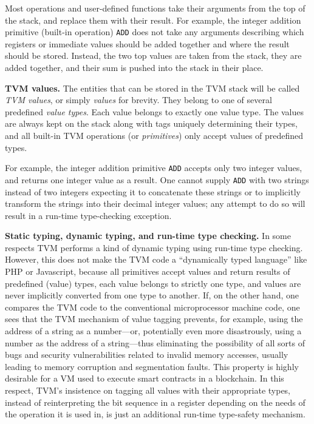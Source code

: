 \documentclass[12pt,oneside]{article}
\def\makepoint#1{\medbreak\noindent{\bf #1.\ }}
\def\nxsubpoint{\refstepcounter{subsubsection}%
  \smallbreak\makepoint{\thesubsubsection}}
\def\emb#1{\textbf{#1.}}
\begin{document}
Most operations and user-defined functions take their arguments from
the top of the stack, and replace them with their result. For example, the integer addition primitive (built-in operation) \texttt{ADD} does not take any arguments describing which registers or immediate values should be added together and where the result should be stored. Instead, the two top values are taken from the stack, they are added together, and their sum is pushed into the stack in their place.

\nxsubpoint\label{sp:tvm.val}\emb{TVM values}
The entities that can be stored in the TVM stack will be called {\em TVM values}, or simply {\em values\/} for brevity. They belong to one of several predefined {\em value types}. Each value belongs to exactly one value type. The values are always kept on the stack along with tags uniquely determining their types, and all built-in TVM operations (or {\em primitives}) only accept values of predefined types.

For example, the integer addition primitive \texttt{ADD} accepts only two integer values, and returns one integer value as a result. One cannot supply \texttt{ADD} with two strings instead of two integers expecting it to concatenate these strings or to implicitly transform the strings into their decimal integer values; any attempt to do so will result in a run-time type-checking exception.

\nxsubpoint\emb{Static typing, dynamic typing, and run-time type checking}
In some respects TVM performs a kind of dynamic typing using run-time type checking. However, this does not make the TVM code a ``dynamically typed language'' like PHP or Javascript, because all primitives accept values and return results of predefined (value) types, each value belongs to strictly one type, and values are never implicitly converted from one type to another. If, on the other hand, one compares the TVM code to the conventional microprocessor machine code, one sees that the TVM mechanism of value tagging prevents, for example, using the address of a string as a number---or, potentially even more disastrously, using a number as the address of a string---thus eliminating the possibility of all sorts of bugs and security vulnerabilities related to invalid memory accesses, usually leading to memory corruption and segmentation faults. This property is highly desirable for a VM used to execute smart contracts in a blockchain. In this respect, TVM's insistence on tagging all values with their appropriate types, instead of reinterpreting the bit sequence in a register depending on the needs of the operation it is used in, is just an additional run-time type-safety mechanism.
\end{document}
